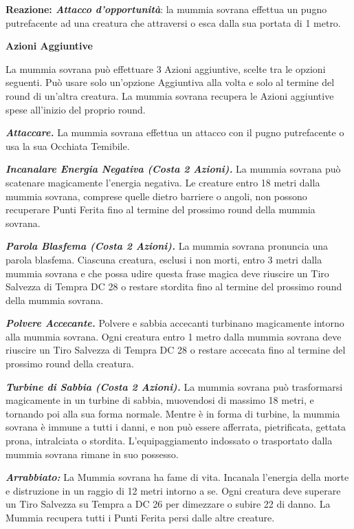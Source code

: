 \begin{multicols}{2}
{\textbf{Reazione: \emph{Attacco d'opportunità}}: la mummia sovrana effettua un pugno putrefacente ad una creatura che attraversi o esca dalla sua portata di 1 metro.

\textbf{Azioni Aggiuntive}

La mummia sovrana può effettuare 3 Azioni aggiuntive, scelte tra le opzioni seguenti. Può usare solo un'opzione Aggiuntiva alla volta e solo al termine del round di un'altra creatura. La mummia sovrana recupera le Azioni aggiuntive spese all'inizio del proprio round.

\emph{\textbf{Attaccare.}} La mummia sovrana effettua un attacco con il pugno putrefacente o usa la sua Occhiata Temibile.

\emph{\textbf{Incanalare Energia Negativa (Costa 2 Azioni).}} La mummia sovrana può scatenare magicamente l'energia negativa. Le creature entro 18 metri dalla mummia sovrana, comprese quelle dietro barriere o angoli, non possono recuperare Punti Ferita fino al termine del prossimo round della mummia sovrana.

\emph{\textbf{Parola Blasfema (Costa 2 Azioni).}} La mummia sovrana pronuncia una parola blasfema. Ciascuna creatura, esclusi i non morti, entro 3 metri dalla mummia sovrana e che possa udire questa frase magica deve riuscire un Tiro Salvezza di Tempra DC 28 o restare stordita fino al termine del prossimo round della mummia sovrana.

\emph{\textbf{Polvere Accecante.}} Polvere e sabbia accecanti turbinano magicamente intorno alla mummia sovrana. Ogni creatura entro 1 metro dalla mummia sovrana deve riuscire un Tiro Salvezza di Tempra DC 28 o restare accecata fino al termine del prossimo round della creatura.

\emph{\textbf{Turbine di Sabbia (Costa 2 Azioni).}} La mummia sovrana può trasformarsi magicamente in un turbine di sabbia, muovendosi di massimo 18 metri, e tornando poi alla sua forma normale. Mentre è in forma di turbine, la mummia sovrana è immune a tutti i danni, e non può essere afferrata, pietrificata, gettata prona, intralciata o stordita. L'equipaggiamento indossato o trasportato dalla mummia sovrana rimane in suo possesso.

\emph{\textbf{Arrabbiato:}} La Mummia sovrana ha fame di vita. Incanala l'energia della morte e distruzione in un raggio di 12 metri intorno a se. Ogni creatura deve superare un Tiro Salvezza su Tempra a DC 26 per dimezzare o subire 22 di danno. La Mummia recupera tutti i Punti Ferita persi dalle altre creature.

}
\end{multicols}
